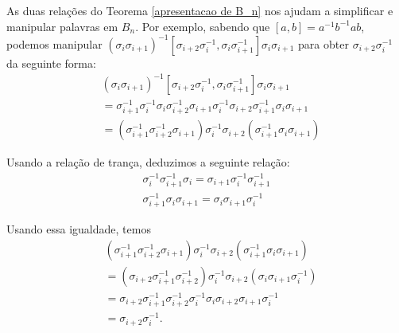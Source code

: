 \documentclass[a4paper,portuguese,11pt,twoside, leqno]{book}
\theoremstyle{definition}
\newtheorem{exercise}{Exercício}[section]
\begin{document}
	\par\vspace{0.3cm} As duas relações do Teorema \eqref{apresentacao de B_n} nos ajudam a simplificar e manipular palavras em $B_n$. Por exemplo, sabendo que $[a,b] = a^{-1}b^{-1}ab$, podemos manipular $(\sigma_i\sigma_{i+1})^{-1}[\sigma_{i+2}\sigma_i^{-1}, \sigma_i\sigma_{i+1}^{-1}]\sigma_i\sigma_{i+1}$ para obter $\sigma_{i+2}\sigma_i^{-1}$ da seguinte forma:
	\begin{align*}
	&(\sigma_i\sigma_{i+1})^{-1}[\sigma_{i+2}\sigma_i^{-1}, \sigma_i\sigma_{i+1}^{-1}]\sigma_i\sigma_{i+1} \\ 
	&= \sigma_{i+1}^{-1}\sigma_i^{-1}\sigma_i\sigma_{i+2}^{-1}\sigma_{i+1}\sigma_i^{-1}\sigma_{i+2}\sigma_{i+1}^{-1}\sigma_i\sigma_{i+1}  \\
	&= (\sigma_{i+1}^{-1}\sigma_{i+2}^{-1}\sigma_{i+1})\sigma_i^{-1}\sigma_{i+2}(\sigma_{i+1}^{-1}\sigma_i\sigma_{i+1})
	\end{align*}
	
	\par\vspace{0.3cm} Usando a relação de trança, deduzimos a seguinte relação:
	\begin{align*}
	\sigma_i^{-1}\sigma_{i+1}^{-1}\sigma_i = \sigma_{i+1}\sigma_i^{-1}\sigma_{i+1}^{-1} \\
	\sigma_{i+1}^{-1}\sigma_i\sigma_{i+1} = \sigma_i\sigma_{i+1}\sigma_i^{-1}   
	\end{align*}
	
	\par\vspace{0.3cm} Usando essa igualdade, temos
	\begin{align*}
	&(\sigma_{i+1}^{-1}\sigma_{i+2}^{-1}\sigma_{i+1})\sigma_i^{-1}\sigma_{i+2}(\sigma_{i+1}^{-1}\sigma_i\sigma_{i+1}) \\
	&= (\sigma_{i+2}\sigma_{i+1}^{-1}\sigma_{i+2}^{-1})\sigma_i^{-1}\sigma_{i+2}(\sigma_i\sigma_{i+1}\sigma_i^{-1}) \\
	&= \sigma_{i+2}\sigma_{i+1}^{-1}\sigma_{i+2}^{-1}\sigma_i^{-1}\sigma_i\sigma_{i+2}\sigma_{i+1}\sigma_i^{-1} \\
	&= \sigma_{i+2}\sigma_i^{-1}.
	\end{align*}
	
	
\end{document}
